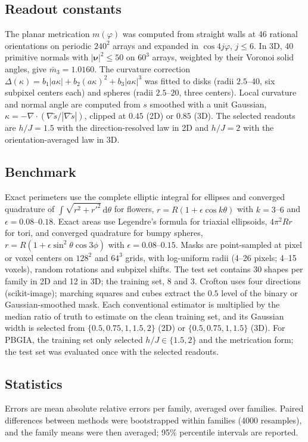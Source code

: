 \documentclass[11pt,a4paper]{article}
\newcommand{\dd}{\mathrm{d}}
\begin{document}
\subsection*{Readout constants}
The planar metrication $m(\varphi)$ was computed from straight walls at 46 rational orientations on periodic $240^2$ arrays and expanded in $\cos4j\varphi$, $j\le6$. In 3D, 40 primitive normals with $|\bm\nu|^2\le50$ on $60^3$ arrays, weighted by their Voronoi solid angles, give $\bar m_3=1.0160$. The curvature correction $\Delta(\kappa)=b_1|a\kappa|+b_2(a\kappa)^2+b_3|a\kappa|^3$ was fitted to disks (radii $2.5$--$40$, six subpixel centers each) and spheres (radii $2.5$--$20$, three centers). Local curvature and normal angle are computed from $s$ smoothed with a unit Gaussian, $\kappa=-\nabla\cdot(\nabla\tilde s/|\nabla\tilde s|)$, clipped at $0.45$ (2D) or $0.85$ (3D). The selected readouts are $h/J=1.5$ with the direction-resolved law in 2D and $h/J=2$ with the orientation-averaged law in 3D.

\subsection*{Benchmark}
Exact perimeters use the complete elliptic integral for ellipses and converged quadrature of $\int\sqrt{r^2+r'^2}\,\dd\theta$ for flowers, $r=R(1+\epsilon\cos k\theta)$ with $k=3$--$6$ and $\epsilon=0.08$--$0.18$. Exact areas use Legendre's formula for triaxial ellipsoids, $4\pi^2Rr$ for tori, and converged quadrature for bumpy spheres, $r=R(1+\epsilon\sin^2\theta\cos3\phi)$ with $\epsilon=0.08$--$0.15$. Masks are point-sampled at pixel or voxel centers on $128^2$ and $64^3$ grids, with log-uniform radii (4--26 pixels; 4--15 voxels), random rotations and subpixel shifts. The test set contains 30 shapes per family in 2D and 12 in 3D; the training set, 8 and 3. Crofton uses four directions (scikit-image\cite{VanderWalt2014}); marching squares and cubes extract the $0.5$ level of the binary or Gaussian-smoothed mask. Each conventional estimator is multiplied by the median ratio of truth to estimate on the clean training set, and its Gaussian width is selected from $\{0.5,0.75,1,1.5,2\}$ (2D) or $\{0.5,0.75,1,1.5\}$ (3D). For PBGIA, the training set only selected $h/J\in\{1.5,2\}$ and the metrication form; the test set was evaluated once with the selected readouts.

\subsection*{Statistics}
Errors are mean absolute relative errors per family, averaged over families. Paired differences between methods were bootstrapped within families (4000 resamples), and the family means were then averaged; 95\% percentile intervals are reported.
\end{document}
